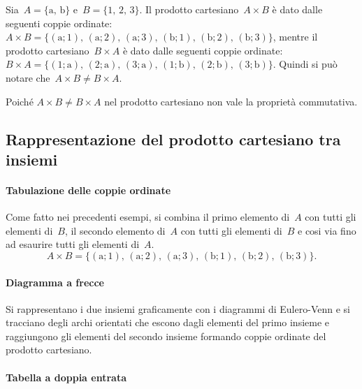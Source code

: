 \begin{exrig}
 \begin{esempio}
Sia~$A=\{\text{a, b}\}$ e~$B=\{\text{1, 2, 3}\}$. Il prodotto cartesiano~$A\times B$ è dato dalle seguenti coppie ordinate:
$A\times B=\{(\text{a};1)\text{, }(\text{a};2)\text{, }(\text{a};3)\text{, }(\text{b};1)\text{, }(\text{b};2)\text{, }(\text{b};3)\}$, mentre il prodotto cartesiano~$B\times A$
è dato dalle seguenti coppie ordinate:
$B\times A=\{(1;\text{a})\text{, }(2;\text{a})\text{, }(3;\text{a})\text{, }(1;\text{b})\text{, }(2;\text{b})\text{, }(3;\text{b})\}$.
Quindi si può notare che~$A\times B\neq B\times A$.
 \end{esempio}
\end{exrig}

Poiché $A\times B\neq B\times A$ nel prodotto cartesiano non vale la
proprietà commutativa.

\vspazio\ovalbox{\risolvii \ref{ese:5.72}, \ref{ese:5.73}, \ref{ese:5.74}, \ref{ese:5.75}, \ref{ese:5.76}, \ref{ese:5.77}}

\subsection{Rappresentazione del prodotto cartesiano tra insiemi}
\paragraph{Tabulazione delle coppie ordinate}

Come fatto nei precedenti esempi, si combina il primo elemento
di~$A$ con tutti gli elementi di~$B$, il secondo elemento
di~$A$ con tutti gli elementi di~$B$ e cosi via fino ad
esaurire tutti gli elementi di~$A$.
\[A\times B=\{(\text{a};1)\text{, }(\text{a};2)\text{, }(\text{a};3)\text{, }(\text{b};1)\text{, }(\text{b};2)\text{, }(\text{b};3)\}.\]

\paragraph{Diagramma a frecce}
Si rappresentano i due insiemi graficamente
con i diagrammi di Eulero-Venn e si tracciano degli archi orientati che
escono dagli elementi del primo insieme e raggiungono gli elementi del
secondo insieme formando coppie ordinate del prodotto cartesiano.
\begin{center}

\end{center}

\paragraph{Tabella a doppia entrata}

